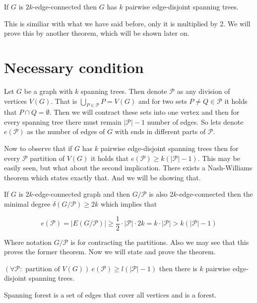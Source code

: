 \begin{thm}
	If $G$ is $2k$-edge-connected then $G$ has $k$ pairwise edge-disjoint spanning trees.
\end{thm}

This is similiar with what we have said before, only it is multiplied by 2. We will prove this by another theorem, which will be shown later on.

\section{Necessary condition}

Let $G$ be a graph with $k$ spanning trees. Then denote $\mathcal{P}$ as any division of vertices $V(G)$. That is $\bigcup_{P \in \mathcal{P}} P = V(G)$ and for two sets $P \neq Q \in \mathcal{P}$ it holds that $P \cap Q = \emptyset$. Then we will contract these sets into one vertex and then for every spanning tree there must remain $|\mathcal{P}| -1$ number of edges. So lets denote $e(\mathcal{P})$ as the number of edges of $G$ with ends in different parts of $\mathcal{P}$.

Now to observe that if $G$ has $k$ pairwise edge-disjoint spanning trees then for every $\mathcal{P}$ partition of $V(G)$ it holds that $e(\mathcal{P}) \geq k (|\mathcal{P}| - 1)$. This may be easily seen, but what about the second implication. There exists a Nash-Williams theorem which states exactly that. And we will be showing that.

\begin{observ}
	If $G$ is $2k$-edge-connected graph and then $G/\mathcal{P}$ is also $2k$-edge-connected then the minimal degree $\delta(G/\mathcal{P}) \geq 2k$ which implies that
	
	$$
	e(\mathcal{P}) = |E(G/\mathcal{P})| \geq \frac{1}{2} \cdot |\mathcal{P}| \cdot 2k = k \cdot |\mathcal{P}| > k (|\mathcal{P}| - 1)
	$$
\end{observ}

Where notation $G / \mathcal{P}$ is for contracting the partitions. Also we may see that this proves the former theorem. Now we will state and prove the theorem.

\begin{thm}
	$(\forall \mathcal{P} : \text{ partition of } V(G)) \ e(\mathcal{P}) \geq l (|\mathcal{P}| - 1)$ then there is $k$ pairwise edge-disjoint spanning trees.
\end{thm}

\begin{defn}
	Spanning forest is a set of edges that cover all vertices and is a forest.
\end{defn}


